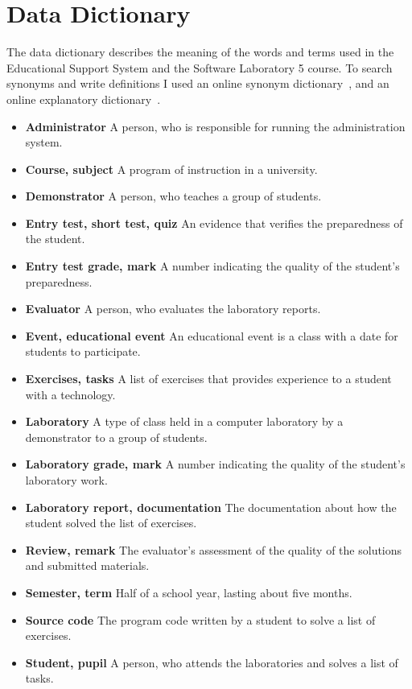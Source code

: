 \chapter{Data Dictionary}
\label{data-dictionary}

The data dictionary describes the meaning of the words and terms used in the Educational Support System and the Software Laboratory 5 course. To search synonyms and write definitions I used an online synonym dictionary~\cite{Thesaurus}, and an online explanatory  dictionary~\cite{Dictionary}.

\begin{itemize}
	\item \textbf{Administrator} A person, who is responsible for running the administration system.
	\item \textbf{Course, subject} A program of instruction in a university.
	\item \textbf{Demonstrator} A person, who teaches a group of students.
	\item \textbf{Entry test, short test, quiz} An evidence that verifies the preparedness of the student.
	\item \textbf{Entry test grade, mark} A number indicating the quality of the student's preparedness.
	\item \textbf{Evaluator} A person, who evaluates the laboratory reports.
	\item \textbf{Event, educational event} An educational event is a class with a date for students to participate.
	\item \textbf{Exercises, tasks} A list of exercises that provides experience to a student with a technology.
	\item \textbf{Laboratory} A type of class held in a computer laboratory by a demonstrator to a group of students.
	\item \textbf{Laboratory grade, mark} A number indicating the quality of the student's laboratory work.
	\item \textbf{Laboratory report, documentation} The documentation about how the student  solved the list of exercises.
	\item \textbf{Review, remark} The evaluator's assessment of the quality of the solutions and submitted materials.
	\item \textbf{Semester, term} Half of a school year, lasting about five months.
	\item \textbf{Source code} The program code written by a student to solve a list of exercises.
	\item \textbf{Student, pupil} A person, who attends the laboratories and solves a list of tasks.
\end{itemize}

